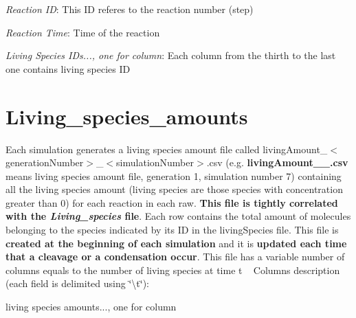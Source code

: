\begin{DoxyItemize}
\item {\itshape Reaction I\+D}\+: This I\+D referes to the reaction number (step)
\item {\itshape Reaction Time}\+: Time of the reaction
\item {\itshape Living Species I\+Ds..., one for column}\+: Each column from the thirth to the last one contains living species I\+D
\end{DoxyItemize}\hypertarget{a00006_outLivAmounts}{}\section{Living\+\_\+species\+\_\+amounts}\label{a00006_outLivAmounts}
Each simulation generates a living species amount file called living\+Amount\+\_\+$<$generation\+Number$>$\+\_\+$<$simulation\+Number$>$.\+csv (e.\+g. {\bfseries living\+Amount\+\_\+\_.\+csv} means living species amount file, generation 1, simulation number 7) containing all the living species amount (living species are those species with concentration greater than 0) for each reaction in each raw. {\bfseries This file is tightly correlated with the {\itshape Living\+\_\+species} file}. Each row contains the total amount of molecules belonging to the species indicated by its I\+D in the living\+Species file. This file is {\bfseries created at the beginning of each simulation} and it is {\bfseries updated each time that a cleavage or a condensation occur}. This file has a variable number of columns equals to the number of living species at time t ~\newline
Columns description (each field is delimited using \char`\"{}\textbackslash{}t\char`\"{})\+: \begin{TabularC}{1}
\hline
living species amounts..., one for column  \\
\end{TabularC}

